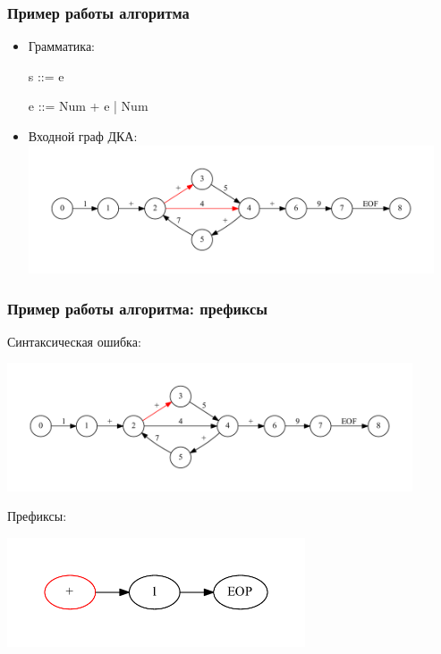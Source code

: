 \documentclass{beamer}
\begin{document}
\begin{frame}[fragile]
	\transwipe[direction=90]
	\frametitle{Пример работы алгоритма}
	\begin{itemize}
	    \item Грамматика:
	 
	 s ::= e
    
     e ::= Num + e | Num 
    
    \item
    Входной граф ДКА:
	            \includegraphics[width=340pt]{pictures/ErrorEdges.pdf}
    \end{itemize}
    
\end{frame}

\begin{frame}[fragile]
	\transwipe[direction=90]
	\frametitle{Пример работы алгоритма: префиксы}
	Синтаксическая ошибка:
	
	\includegraphics[width=340pt]{pictures/PlusErrorFull.pdf}
	
	Префиксы:
	
    \includegraphics[width=250pt]{pictures/pluserror.pdf}
    
\end{frame}
\end{document}

